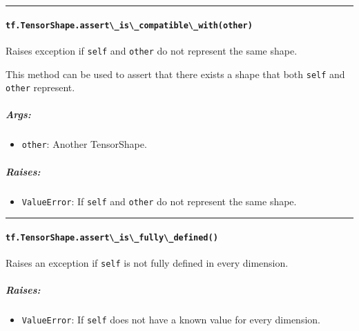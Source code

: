 \begin{center}\rule{0.5\linewidth}{\linethickness}\end{center}

\paragraph{\texorpdfstring{\lstinline{tf.TensorShape.assert\_is\_compatible\_with(other)}
}{tf.TensorShape.assert\_is\_compatible\_with(other) }}\label{tf.tensorshape.assertux5fisux5fcompatibleux5fwithother}

Raises exception if \lstinline{self} and \lstinline{other} do not represent
the same shape.

This method can be used to assert that there exists a shape that both
\lstinline{self} and \lstinline{other} represent.

\subparagraph{Args: }\label{args-38}

\begin{itemize}
\tightlist
\item
  \lstinline{other}: Another TensorShape.
\end{itemize}

\subparagraph{Raises: }\label{raises-23}

\begin{itemize}
\tightlist
\item
  \lstinline{ValueError}: If \lstinline{self} and \lstinline{other} do not
  represent the same shape.
\end{itemize}

\begin{center}\rule{0.5\linewidth}{\linethickness}\end{center}

\paragraph{\texorpdfstring{\lstinline{tf.TensorShape.assert\_is\_fully\_defined()}
}{tf.TensorShape.assert\_is\_fully\_defined() }}\label{tf.tensorshape.assertux5fisux5ffullyux5fdefined}

Raises an exception if \lstinline{self} is not fully defined in every
dimension.

\subparagraph{Raises: }\label{raises-24}

\begin{itemize}
\tightlist
\item
  \lstinline{ValueError}: If \lstinline{self} does not have a known value for
  every dimension.
\end{itemize}

